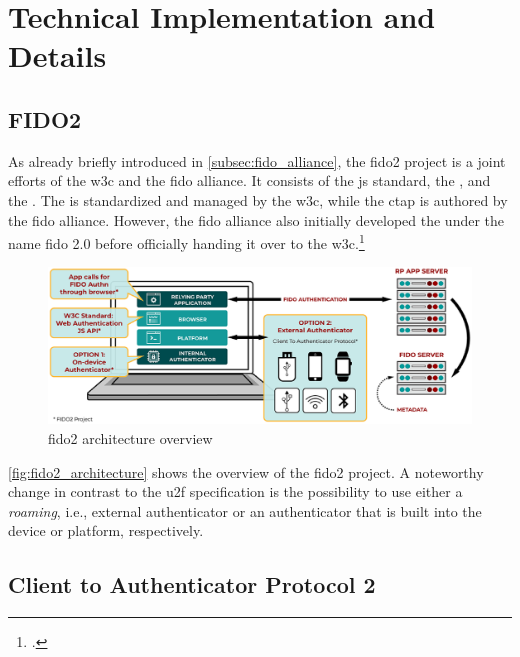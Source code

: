 \section{Technical Implementation and Details}

\subsection{FIDO2}

As already briefly introduced in \autoref{subsec:fido_alliance}, the \gls{fido}2 project is a joint efforts of the \gls{w3c} and the \gls{fido} alliance. It consists of the \gls{js} standard, the \wa{}, and the . The \wa{} is standardized and managed by the \gls{w3c}, while the \gls{ctap} is authored by the \gls{fido} alliance. However, the \gls{fido} alliance also initially developed the \wa{} under the name \gls{fido} 2.0 before officially handing it over to the \gls{w3c}.\footcites[See][254]{Schwartz2018}[See][3]{FormalVerificationWebAuthn}

\begin{figure}[hbt]
	\centering
	\includegraphics[width=\textwidth]{pics/FIDO2-Graphic-v2.eps}
	\caption[\gls{fido}2 architecture overview]{\gls{fido}2 architecture overview\footnotemark}
	\label{fig:fido2_architecture}
\end{figure}

\autoref{fig:fido2_architecture} shows the overview of the \gls{fido}2 project. A noteworthy change in contrast to the \gls{u2f} specification is the possibility to use either a \textit{roaming}, i.e., external authenticator or an authenticator that is built into the device or platform, respectively.

\subsection{Client to Authenticator Protocol 2}

